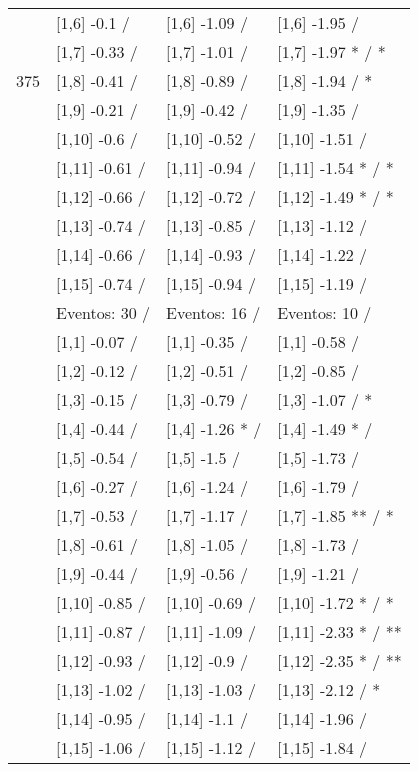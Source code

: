 \begin{table}
\begin{tabular}[t]{llll}
 & {}[1,6] -0.1  / & {}[1,6] -1.09  / & {}[1,6] -1.95  /\\
 & {}[1,7] -0.33  / & {}[1,7] -1.01  / & {}[1,7] -1.97 * / *\\
375 & {}[1,8] -0.41  / & {}[1,8] -0.89  / & {}[1,8] -1.94  / *\\
\addlinespace
 & {}[1,9] -0.21  / & {}[1,9] -0.42  / & {}[1,9] -1.35  /\\
 & {}[1,10] -0.6  / & {}[1,10] -0.52  / & {}[1,10] -1.51  /\\
 & {}[1,11] -0.61  / & {}[1,11] -0.94  / & {}[1,11] -1.54 * / *\\
 & {}[1,12] -0.66  / & {}[1,12] -0.72  / & {}[1,12] -1.49 * / *\\
 & {}[1,13] -0.74  / & {}[1,13] -0.85  / & {}[1,13] -1.12  /\\
\addlinespace
 & {}[1,14] -0.66  / & {}[1,14] -0.93  / & {}[1,14] -1.22  /\\
 & {}[1,15] -0.74  / & {}[1,15] -0.94  / & {}[1,15] -1.19  /\\
 & Eventos:  30 / & Eventos:  16 / & Eventos:  10 /\\
 & {}[1,1] -0.07  / & {}[1,1] -0.35  / & {}[1,1] -0.58  /\\
 & {}[1,2] -0.12  / & {}[1,2] -0.51  / & {}[1,2] -0.85  /\\
\addlinespace
 & {}[1,3] -0.15  / & {}[1,3] -0.79  / & {}[1,3] -1.07  / *\\
 & {}[1,4] -0.44  / & {}[1,4] -1.26 * / & {}[1,4] -1.49 * /\\
 & {}[1,5] -0.54  / & {}[1,5] -1.5  / & {}[1,5] -1.73  /\\
 & {}[1,6] -0.27  / & {}[1,6] -1.24  / & {}[1,6] -1.79  /\\
 & {}[1,7] -0.53  / & {}[1,7] -1.17  / & {}[1,7] -1.85 ** / *\\
\addlinespace
500 & {}[1,8] -0.61  / & {}[1,8] -1.05  / & {}[1,8] -1.73  /\\
 & {}[1,9] -0.44  / & {}[1,9] -0.56  / & {}[1,9] -1.21  /\\
 & {}[1,10] -0.85  / & {}[1,10] -0.69  / & {}[1,10] -1.72 * / *\\
 & {}[1,11] -0.87  / & {}[1,11] -1.09  / & {}[1,11] -2.33 * / **\\
 & {}[1,12] -0.93  / & {}[1,12] -0.9  / & {}[1,12] -2.35 * / **\\
\addlinespace
 & {}[1,13] -1.02  / & {}[1,13] -1.03  / & {}[1,13] -2.12  / *\\
 & {}[1,14] -0.95  / & {}[1,14] -1.1  / & {}[1,14] -1.96  /\\
 & {}[1,15] -1.06  / & {}[1,15] -1.12  / & {}[1,15] -1.84  /\\
\bottomrule
\end{tabular}
\end{table}
